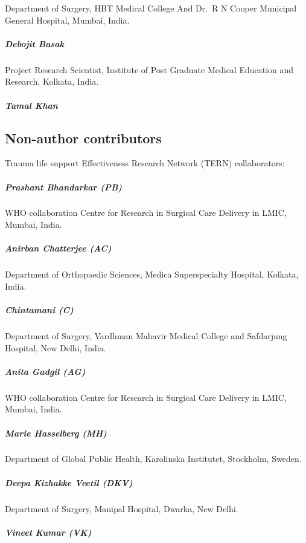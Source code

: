 \documentclass[
]{article}
\begin{document}
Department of Surgery, HBT Medical College And Dr.~R N Cooper Municipal General Hospital, Mumbai, India.

\hypertarget{debojit-basak}{%
\subparagraph{Debojit Basak}\label{debojit-basak}}

Project Research Scientist, Institute of Post Graduate Medical Education and Research, Kolkata, India.

\hypertarget{tamal-khan}{%
\subparagraph{Tamal Khan}\label{tamal-khan}}

\hypertarget{non-author-contributors}{%
\subsection{Non-author contributors}\label{non-author-contributors}}

Trauma life support Effectiveness Research Network (TERN) collaborators:

\hypertarget{prashant-bhandarkar-pb}{%
\subparagraph{Prashant Bhandarkar (PB)}\label{prashant-bhandarkar-pb}}

WHO collaboration Centre for Research in Surgical Care Delivery in LMIC, Mumbai, India.

\hypertarget{anirban-chatterjee-ac}{%
\subparagraph{Anirban Chatterjee (AC)}\label{anirban-chatterjee-ac}}

Department of Orthopaedic Sciences, Medica Superspecialty Hospital, Kolkata, India.

\hypertarget{chintamani-c}{%
\subparagraph{Chintamani (C)}\label{chintamani-c}}

Department of Surgery, Vardhman Mahavir Medical College and Safdarjung Hospital, New Delhi, India.

\hypertarget{anita-gadgil-ag}{%
\subparagraph{Anita Gadgil (AG)}\label{anita-gadgil-ag}}

WHO collaboration Centre for Research in Surgical Care Delivery in LMIC, Mumbai, India.

\hypertarget{marie-hasselberg-mh}{%
\subparagraph{Marie Hasselberg (MH)}\label{marie-hasselberg-mh}}

Department of Global Public Health, Karolinska Institutet, Stockholm, Sweden.

\hypertarget{deepa-kizhakke-veetil-dkv}{%
\subparagraph{Deepa Kizhakke Veetil (DKV)}\label{deepa-kizhakke-veetil-dkv}}

Department of Surgery, Manipal Hospital, Dwarka, New Delhi.

\hypertarget{vineet-kumar-vk}{%
\subparagraph{Vineet Kumar (VK)}\label{vineet-kumar-vk}}
\end{document}
